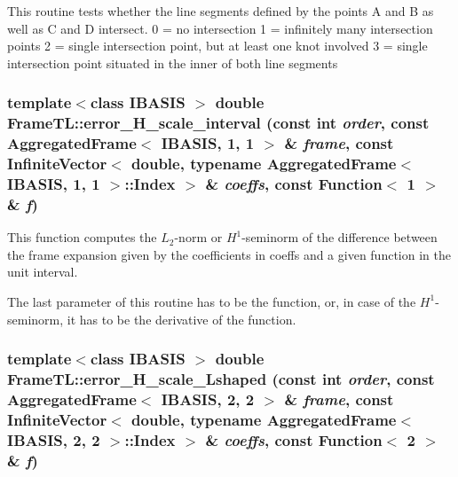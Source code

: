 This routine tests whether the line segments defined by the points A and B as well as C and D intersect. 0 = no intersection 1 = infinitely many intersection points 2 = single intersection point, but at least one knot involved 3 = single intersection point situated in the inner of both line segments \hypertarget{namespaceFrameTL_addaaee53d308a6093a25ed95f86cc85}{
\subsubsection[{error\_\-H\_\-scale\_\-interval}]{\setlength{\rightskip}{0pt plus 5cm}template$<$class IBASIS $>$ double FrameTL::error\_\-H\_\-scale\_\-interval (const int {\em order}, \/  const AggregatedFrame$<$ IBASIS, 1, 1 $>$ \& {\em frame}, \/  const InfiniteVector$<$ double, typename AggregatedFrame$<$ IBASIS, 1, 1 $>$::Index $>$ \& {\em coeffs}, \/  const Function$<$ 1 $>$ \& {\em f})}}
\label{namespaceFrameTL_addaaee53d308a6093a25ed95f86cc85}


This function computes the $L_2$-norm or $H^1$-seminorm of the difference between the frame expansion given by the coefficients in coeffs and a given function in the unit interval. 

The last parameter of this routine has to be the function, or, in case of the $H^1$-seminorm, it has to be the derivative of the function. \hypertarget{namespaceFrameTL_54aa679fc30456b9ca268846c1926992}{
\subsubsection[{error\_\-H\_\-scale\_\-Lshaped}]{\setlength{\rightskip}{0pt plus 5cm}template$<$class IBASIS $>$ double FrameTL::error\_\-H\_\-scale\_\-Lshaped (const int {\em order}, \/  const AggregatedFrame$<$ IBASIS, 2, 2 $>$ \& {\em frame}, \/  const InfiniteVector$<$ double, typename AggregatedFrame$<$ IBASIS, 2, 2 $>$::Index $>$ \& {\em coeffs}, \/  const Function$<$ 2 $>$ \& {\em f})}}
\label{namespaceFrameTL_54aa679fc30456b9ca268846c1926992}


